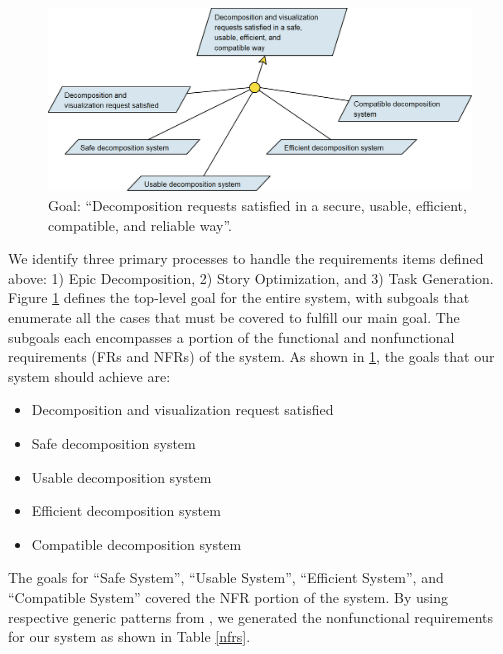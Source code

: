 \begin{figure}
\centerline{\includegraphics[width=\textwidth,height=\textheight,keepaspectratio]{./figure/GoalsNFR1.png}}
\caption{Goal: “Decomposition requests satisfied in a secure, usable, efficient, compatible, and reliable way”.}
\label{goal1}
\end{figure}

We identify three primary processes to handle the requirements items defined above: 1) Epic Decomposition, 2) Story Optimization, and 3) Task Generation. Figure \ref{goal1} defines the top-level goal for the entire system, with subgoals that enumerate all the cases that must be covered to fulfill our main goal. The subgoals each encompasses a portion of the functional and nonfunctional requirements (FRs and NFRs) of the system. As shown in \ref{goal1}, the goals that our system should achieve are:

\begin{itemize}
	\item Decomposition and visualization request satisfied
	\item Safe decomposition system
	\item Usable decomposition system
	\item Efficient decomposition system
	\item Compatible decomposition system
\end{itemize}

The goals for “Safe System”, “Usable System”, “Efficient System”, and “Compatible System” covered the NFR portion of the system. By using respective generic patterns from \cite{KAOS}, we generated the nonfunctional requirements for our system as shown in Table \ref{nfrs}.

